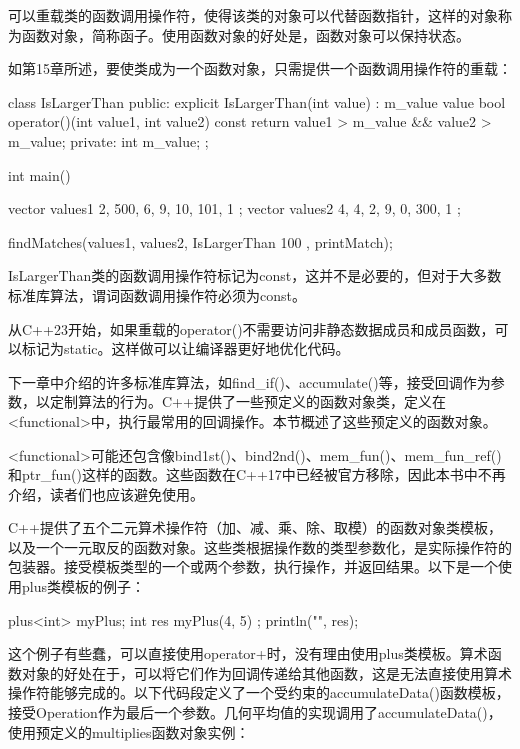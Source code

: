 
可以重载类的函数调用操作符，使得该类的对象可以代替函数指针，这样的对象称为函数对象，简称函子。使用函数对象的好处是，函数对象可以保持状态。


如第15章所述，要使类成为一个函数对象，只需提供一个函数调用操作符的重载：

\begin{cpp}
class IsLargerThan
{
    public:
        explicit IsLargerThan(int value) : m_value { value } {}
        bool operator()(int value1, int value2) const {
            return value1 > m_value && value2 > m_value;
        }
    private:
        int m_value;
};

int main()
{
    vector values1 { 2, 500, 6, 9, 10, 101, 1 };
    vector values2 { 4, 4, 2, 9, 0, 300, 1 };

    findMatches(values1, values2, IsLargerThan { 100 }, printMatch);
}
\end{cpp}

IsLargerThan类的函数调用操作符标记为const，这并不是必要的，但对于大多数标准库算法，谓词函数调用操作符必须为const。

从C++23开始，如果重载的operator()不需要访问非静态数据成员和成员函数，可以标记为static。这样做可以让编译器更好地优化代码。



下一章中介绍的许多标准库算法，如find\_if()、accumulate()等，接受回调作为参数，以定制算法的行为。C++提供了一些预定义的函数对象类，定义在<functional>中，执行最常用的回调操作。本节概述了这些预定义的函数对象。

<functional>可能还包含像bind1st()、bind2nd()、mem\_fun()、mem\_fun\_ref()和ptr\_fun()这样的函数。这些函数在C++17中已经被官方移除，因此本书中不再介绍，读者们也应该避免使用。


C++提供了五个二元算术操作符（加、减、乘、除、取模）的函数对象类模板，以及一个一元取反的函数对象。这些类根据操作数的类型参数化，是实际操作符的包装器。接受模板类型的一个或两个参数，执行操作，并返回结果。以下是一个使用plus类模板的例子：

\begin{cpp}
plus<int> myPlus;
int res { myPlus(4, 5) };
println("{}", res);
\end{cpp}

这个例子有些蠢，可以直接使用operator+时，没有理由使用plus类模板。算术函数对象的好处在于，可以将它们作为回调传递给其他函数，这是无法直接使用算术操作符能够完成的。以下代码段定义了一个受约束的accumulateData()函数模板，接受Operation作为最后一个参数。几何平均值的实现调用了accumulateData()，使用预定义的multiplies函数对象实例：

